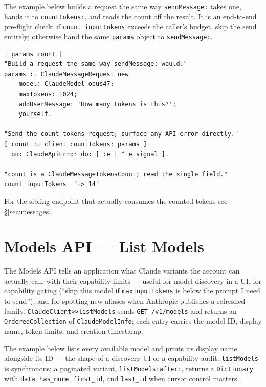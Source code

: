 \documentclass[a4paper,10pt,fleqn]{article}
\begin{document}
The example below builds a request the same way
\texttt{sendMessage:} takes one, hands it to \texttt{countTokens:},
and reads the count off the result.  It is an end-to-end pre-flight
check: if \texttt{count inputTokens} exceeds the caller's budget,
skip the send entirely; otherwise hand the same \texttt{params}
object to \texttt{sendMessage:}.

\begin{lstlisting}[language={},title={Count tokens}]
| params count |
"Build a request the same way sendMessage: would."
params := ClaudeMessageRequest new
    model: ClaudeModel opus47;
    maxTokens: 1024;
    addUserMessage: 'How many tokens is this?';
    yourself.

"Send the count-tokens request; surface any API error directly."
[ count := client countTokens: params ]
  on: ClaudeApiError do: [ :e | ^ e signal ].

"count is a ClaudeMessageTokensCount; read the single field."
count inputTokens  "=> 14"
\end{lstlisting}

For the sibling endpoint that actually consumes the counted tokens
see \S\ref{sec:messages}.

\medskip
{}

\section{Models API --- List Models}
\label{sec:models-list}

The Models API tells an application what Claude variants the
account can actually call, with their capability limits --- useful
for model discovery in a UI, for capability gating (``skip this
model if \texttt{maxInputTokens} is below the prompt I need to
send''), and for spotting new aliases when Anthropic publishes a
refreshed family.  \texttt{ClaudeClient>>listModels} sends
\texttt{GET /v1/models} and returns an \texttt{OrderedCollection}
of \texttt{ClaudeModelInfo}; each entry carries the model ID,
display name, token limits, and creation timestamp.

The example below lists every available model and prints its
display name alongside its ID --- the shape of a discovery UI or a
capability audit.  \texttt{listModels} is synchronous; a
paginated variant, \texttt{listModels:after:}, returns a
\texttt{Dictionary} with \texttt{data}, \texttt{has\_more},
\texttt{first\_id}, and \texttt{last\_id} when cursor control
matters.
\end{document}
